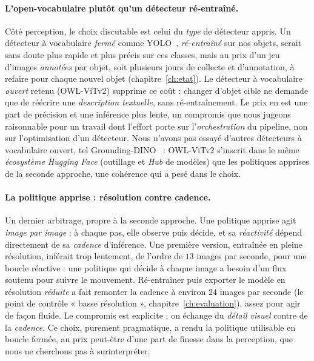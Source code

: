 \paragraph{L'open-vocabulaire plutôt qu'un détecteur ré-entraîné.}
Côté perception, le choix discutable est celui du \emph{type} de détecteur appris. Un détecteur à vocabulaire \emph{fermé} comme YOLO~\cite{redmon_yolo_2016}, \emph{ré-entraîné} sur nos objets, serait sans doute plus rapide et plus précis sur ces classes, mais au prix d'un jeu d'images \emph{annotées} par objet, soit plusieurs jours de collecte et d'annotation, à refaire pour chaque nouvel objet (chapitre~\ref{ch:etat}). Le détecteur à vocabulaire \emph{ouvert} retenu (OWL-ViTv2) supprime ce coût : changer d'objet cible ne demande que de réécrire une \emph{description textuelle}, sans ré-entraînement. Le prix en est une part de précision et une inférence plus lente, un compromis que nous jugeons raisonnable pour un travail dont l'effort porte sur l'\emph{orchestration} du pipeline, non sur l'optimisation d'un détecteur. Nous n'avons pas essayé d'autres détecteurs à vocabulaire ouvert, tel Grounding-DINO~\cite{liu_grounding_dino_2024} : OWL-ViTv2 s'inscrit dans le même \emph{écosystème Hugging Face} (outillage et \emph{Hub} de modèles) que les politiques apprises de la seconde approche, une cohérence qui a pesé dans le choix.

\paragraph{La politique apprise : résolution contre cadence.}
Un dernier arbitrage, propre à la seconde approche. Une politique apprise agit \emph{image par image} : à chaque pas, elle observe puis décide, et sa \emph{réactivité} dépend directement de sa \emph{cadence} d'inférence. Une première version, entraînée en pleine résolution, inférait trop lentement, de l'ordre de $13$ images par seconde, pour une boucle réactive : une politique qui décide à chaque image a besoin d'un flux soutenu pour suivre le mouvement. Ré-entraîner puis exporter le modèle en résolution \emph{réduite} a fait remonter la cadence à environ $24$ images par seconde (le point de contrôle « basse résolution », chapitre~\ref{ch:evaluation}), assez pour agir de façon fluide. Le compromis est explicite : on échange du \emph{détail visuel} contre de la \emph{cadence}. Ce choix, purement pragmatique, a rendu la politique utilisable en boucle fermée, au prix peut-être d'une part de finesse dans la perception, que nous ne cherchons pas à surinterpréter.

